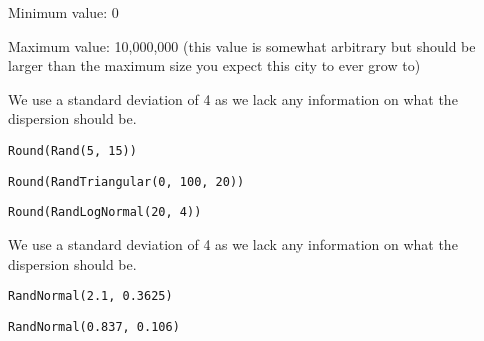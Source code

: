 \documentclass[]{memoir}
\begin{document}

Minimum value: 0

Maximum value: 10,000,000 (this value is somewhat arbitrary but should
be larger than the maximum size you expect this city to ever grow to)


We use a standard deviation of 4 as we lack any information on what the
dispersion should be.

\lstinline!Round(Rand(5, 15))!


\lstinline!Round(RandTriangular(0, 100, 20))!


\lstinline!Round(RandLogNormal(20, 4))!

We use a standard deviation of 4 as we lack any information on what the
dispersion should be.


\lstinline!RandNormal(2.1, 0.3625)!


\lstinline!RandNormal(0.837, 0.106)!
\end{document}
